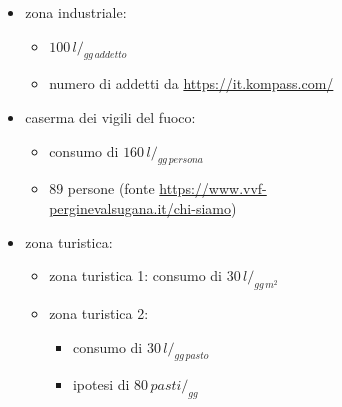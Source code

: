 \documentclass{beamer}
\begin{document}
{\begin{frame}[allowframebreaks]
\begin{columns}
\begin{column}{.45\textwidth}
\begin{figure}
   \end{figure}
  \end{column}
%
  \begin{column}{0.55\textwidth}
   \begin{itemize}
    \item zona industriale:
    \begin{itemize}
     \item $100\,l/_{gg\,addetto}$
     \item numero di addetti da \url{https://it.kompass.com/}
    \end{itemize}
    \item caserma dei vigili del fuoco: 
    \begin{itemize}
     \item consumo di $160\,l/_{gg\,persona}$
     \item $89$ persone (fonte \url{https://www.vvf-perginevalsugana.it/chi-siamo})
    \end{itemize}
    \item zona turistica:
    \begin{itemize}
     \item zona turistica 1: consumo di $30\,l/_{gg\,m^2}$
     \item zona turistica 2:
     \begin{itemize}
      \item consumo di $30\,l/_{gg\,pasto}$
	  \item ipotesi di $80\,pasti/_{gg}$
     \end{itemize}
    \end{itemize}
   \end{itemize}
  \end{column}
 \end{columns}

\end{frame}}
\end{document}
